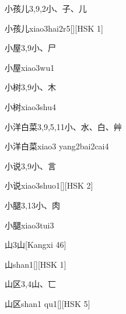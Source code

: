 \begin{entry}{小孩儿}{3,9,2}{⼩、⼦、⼉}
  \begin{phonetics}{小孩儿}{xiao3hai2r5}[][HSK 1]
  \end{phonetics}
\end{entry}

\begin{entry}{小屋}{3,9}{⼩、⼫}
  \begin{phonetics}{小屋}{xiao3wu1}
  \end{phonetics}
\end{entry}

\begin{entry}{小树}{3,9}{⼩、⽊}
  \begin{phonetics}{小树}{xiao3shu4}
  \end{phonetics}
\end{entry}

\begin{entry}{小洋白菜}{3,9,5,11}{⼩、⽔、⽩、⾋}
  \begin{phonetics}{小洋白菜}{xiao3 yang2bai2cai4}
  \end{phonetics}
\end{entry}

\begin{entry}{小说}{3,9}{⼩、⾔}
  \begin{phonetics}{小说}{xiao3shuo1}[][HSK 2]
  \end{phonetics}
\end{entry}

\begin{entry}{小腿}{3,13}{⼩、⾁}
  \begin{phonetics}{小腿}{xiao3tui3}
  \end{phonetics}
\end{entry}

\begin{entry}{山}{3}{⼭}[Kangxi 46]
  \begin{phonetics}{山}{shan1}[][HSK 1]
  \end{phonetics}
\end{entry}

\begin{entry}{山区}{3,4}{⼭、⼖}
  \begin{phonetics}{山区}{shan1 qu1}[][HSK 5]
  \end{phonetics}
\end{entry}

